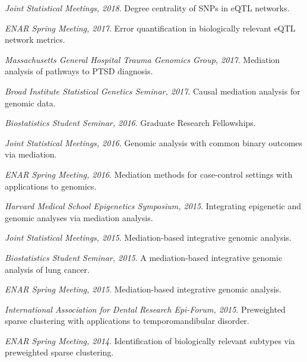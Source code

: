 
\vspace{-6mm}
\begin{cventries}

  \cventry
    {} %
    {} %
    {} %
    {} %
    {
      \begin{cvitems} %
\item \textit{Joint Statistical Meetings, 2018}. Degree centrality of SNPs in eQTL networks.
\item \textit{ENAR Spring Meeting, 2017}. Error quantification in biologically relevant eQTL network metrics.
\item \textit{Massachusetts General Hospital Trauma Genomics Group, 2017}. Mediation analysis of pathways to PTSD diagnosis.
\item \textit{Broad Institute Statistical Genetics Seminar, 2017}. Causal mediation analysis for genomic data.
\item \textit{Biostatistics Student Seminar, 2016}. Graduate Research Fellowships.
\item \textit{Joint Statistical Meetings, 2016}. Genomic analysis with common binary outcomes via mediation.
\item \textit{ENAR Spring Meeting, 2016}. Mediation methods for case-control settings with applications to genomics.
\item \textit{Harvard Medical School Epigenetics Symposium, 2015}. Integrating epigenetic and genomic analyses via mediation analysis.
\item \textit{Joint Statistical Meetings, 2015}. Mediation-based integrative genomic analysis.
\item \textit{Biostatistics Student Seminar, 2015}. A mediation-based integrative genomic analysis of lung cancer.
\item \textit{ENAR Spring Meeting, 2015}. Mediation-based integrative genomic analysis.
\item \textit{International Association for Dental Research Epi-Forum, 2015}. Preweighted sparse clustering with applications to temporomandibular disorder.
\item \textit{ENAR Spring Meeting, 2014}. Identification of biologically relevant subtypes via preweighted sparse clustering.
      \end{cvitems}
    }
\end{cventries}


